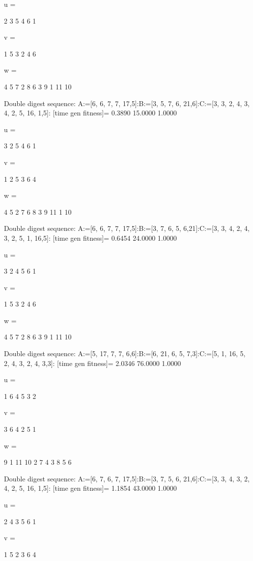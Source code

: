 u =

     2     3     5     4     6     1


v =

     1     5     3     2     4     6


w =

     4     5     7     2     8     6     3     9     1    11    10

Double digest sequence:
A:=[6, 6, 7, 7, 17,5]:B:=[3, 5, 7, 6, 21,6]:C:=[3, 3, 2, 4, 3, 4, 2, 5, 16, 1,5]:
[time gen fitness]=
    0.3890   15.0000    1.0000


u =

     3     2     5     4     6     1


v =

     1     2     5     3     6     4


w =

     4     5     2     7     6     8     3     9    11     1    10

Double digest sequence:
A:=[6, 6, 7, 7, 17,5]:B:=[3, 7, 6, 5, 6,21]:C:=[3, 3, 4, 2, 4, 3, 2, 5, 1, 16,5]:
[time gen fitness]=
    0.6454   24.0000    1.0000


u =

     3     2     4     5     6     1


v =

     1     5     3     2     4     6


w =

     4     5     7     2     8     6     3     9     1    11    10

Double digest sequence:
A:=[5, 17, 7, 7, 6,6]:B:=[6, 21, 6, 5, 7,3]:C:=[5, 1, 16, 5, 2, 4, 3, 2, 4, 3,3]:
[time gen fitness]=
    2.0346   76.0000    1.0000


u =

     1     6     4     5     3     2


v =

     3     6     4     2     5     1


w =

     9     1    11    10     2     7     4     3     8     5     6

Double digest sequence:
A:=[6, 7, 6, 7, 17,5]:B:=[3, 7, 5, 6, 21,6]:C:=[3, 3, 4, 3, 2, 4, 2, 5, 16, 1,5]:
[time gen fitness]=
    1.1854   43.0000    1.0000


u =

     2     4     3     5     6     1


v =

     1     5     2     3     6     4


